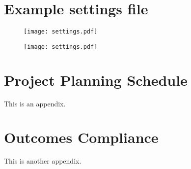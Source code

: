 \graphicspath{{appendices/}}

\chapter{Example settings file}
\makeatletter{}\makeatother
\label{appen:settings}
\begin{figure}[H]
    \centering
    \texttt{[image: settings.pdf]}
    \label{fig:sett1}
\end{figure}
\newpage
\begin{figure}[H]
    \centering
    \texttt{[image: settings.pdf]}
    \label{fig:sett2}
\end{figure}

\chapter{Project Planning Schedule}
\makeatletter{}\makeatother
\label{appen:PPS}

This is an appendix.

\chapter{Outcomes Compliance}
\makeatletter{}\makeatother
\label{appen:OC}

This is another appendix.